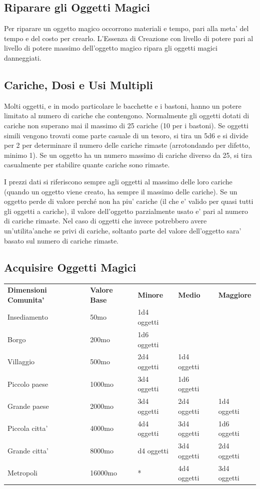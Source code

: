 \documentclass[a4paper,11pt,twoside,openany]{book}
\begin{document}
\subsection{Riparare gli Oggetti Magici}
\label{riparare-gli-oggetti-magici}

Per riparare un oggetto magico occorrono materiali e tempo, pari alla meta' del tempo e del costo per crearlo. L'Essenza di Creazione con livello di potere pari al livello di potere massimo dell'oggetto magico ripara gli oggetti magici danneggiati.


\subsection{Cariche, Dosi e Usi Multipli}

\label{cariche-dosi-e-usi-multipli}

Molti oggetti, e in modo particolare le bacchette e i bastoni, hanno un potere limitato al numero di cariche che contengono. Normalmente gli oggetti dotati di cariche non superano mai il massimo di 25 cariche (10 per i bastoni). Se oggetti simili vengono trovati come parte casuale di un tesoro, si tira un 5d6 e si divide per 2 per determinare il numero delle cariche rimaste (arrotondando per difetto, minimo 1). Se un oggetto ha un numero massimo di cariche diverso da 25, si tira casualmente per stabilire quante cariche sono rimaste.

I prezzi dati si riferiscono sempre agli oggetti al massimo delle loro cariche (quando un oggetto viene creato, ha sempre il massimo delle cariche). Se un oggetto perde di valore perché non ha piu' cariche (il che e' valido per quasi tutti gli oggetti a cariche), il valore dell'oggetto parzialmente usato e' pari al numero di cariche rimaste. Nel caso di oggetti che invece potrebbero avere un'utilita'anche se privi di cariche, soltanto parte del valore dell'oggetto sara' basato sul numero di cariche rimaste.


\subsection{Acquisire Oggetti Magici}

\label{acquisire-oggetti-magici}

\bigskip

\begin{tabular}{lllll}
\toprule 
\textbf{Dimensioni Comunita'} & \textbf{Valore Base} & \textbf{Minore} & \textbf{Medio} & \textbf{Maggiore}\tabularnewline
Insediamento & 50mo & 1d4 oggetti & & \tabularnewline
Borgo & 200mo & 1d6 oggetti & & \tabularnewline
Villaggio & 500mo & 2d4 oggetti & 1d4 oggetti & \tabularnewline
Piccolo paese & 1000mo & 3d4 oggetti & 1d6 oggetti & \tabularnewline
Grande paese & 2000mo & 3d4 oggetti & 2d4 oggetti & 1d4 oggetti\tabularnewline
Piccola citta' & 4000mo & 4d4 oggetti & 3d4 oggetti & 1d6 oggetti\tabularnewline
Grande citta' & 8000mo & d4 oggetti & 3d4 oggetti & 2d4 oggetti\tabularnewline
Metropoli & 16000mo & {*} & 4d4 oggetti & 3d4 oggetti\tabularnewline
\end{tabular}
\end{document}
